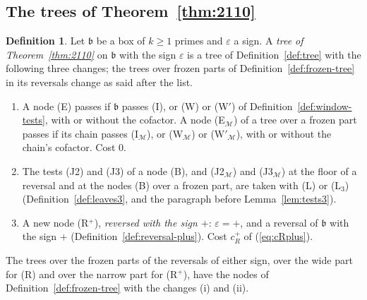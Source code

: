 \documentclass[11pt]{article}
\theoremstyle{definition}
\newtheorem{definition}[theorem]{Definition}
\begin{document}
\subsection{The trees of Theorem~\ref{thm:2110}}

\begin{definition}\label{def:tree-b}
Let $\mathfrak b$ be a box of $k \ge 1$ primes and $\varepsilon$ a sign. A \emph{tree of Theorem~\ref{thm:2110}} on
$\mathfrak b$ with the sign $\varepsilon$ is a tree of Definition~\ref{def:tree} with the following three changes; the
trees over frozen parts of Definition~\ref{def:frozen-tree} in its reversals change as said after the list.
\begin{enumerate}
\item[(i)] A node (E) passes if $\mathfrak b$ passes (I), or (W) or (W$'$) of Definition~\ref{def:window-tests}, with
  or without the cofactor. A node (E$_{\mathcal M}$) of a tree over a frozen part passes if its chain passes
  (I$_{\mathcal M}$), or (W$_{\mathcal M}$) or (W$'_{\mathcal M}$), with or without the chain's cofactor. Cost $0$.
\item[(ii)] The tests (J2) and (J3) of a node (B), and (J2$_{\mathcal M}$) and (J3$_{\mathcal M}$) at the floor of
  a reversal and at the nodes (B) over a frozen part, are taken with (L) or (L$_3$) (Definition~\ref{def:leaves3}, and
  the paragraph before Lemma~\ref{lem:tests3}).
\item[(iii)] A new node (R$^+$), \emph{reversed with the sign $+$}: $\varepsilon = +$, and a reversal of $\mathfrak b$
  with the sign $+$ (Definition~\ref{def:reversal-plus}). Cost $c_R^+$ of (\ref{eq:cRplus}).
\end{enumerate}
The trees over the frozen parts of the reversals of either sign, over the wide part for (R) and over the narrow part
for (R$^+$), have the nodes of Definition~\ref{def:frozen-tree} with the changes (i) and (ii).
\end{definition}
\end{document}
